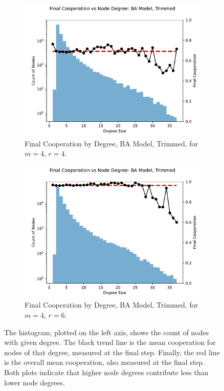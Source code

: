 \FloatBarrier 
\begin{figure}[!h]
  \begin{subfigure}[b]{0.45\textwidth}
    \includegraphics[width=1.1\textwidth]{images/ID_BA_node_groups_m_4_phi_4_trimmed.pdf}
    \caption{Final Cooperation by Degree, BA Model, Trimmed, for $m=4$, $r=4$.   }
    \label{ID_by_degree_m_4_phi_4}
  \end{subfigure}
  \hfill
  \begin{subfigure}[b]{0.45\textwidth}
    \includegraphics[width=1.1\textwidth]{images/ID_BA_node_groups_m_4_phi_6_trimmed.pdf}
    \caption{Final Cooperation by Degree, BA Model, Trimmed, for $m=4$, $r=6$. }
    \label{ID_by_degree_m_4_phi_6}
  \end{subfigure}
  \caption{The histogram, plotted on the left axis, shows the count of nodes with given degree. The black trend line is the mean cooperation for nodes of that degree, measured at the final step. Finally, the red line is the overall mean cooperation, also measured at the final step. Both plots indicate that higher node degrees contribute less than lower node degrees.} \label{ID_by_degree_m_4}
\end{figure} 
\FloatBarrier


